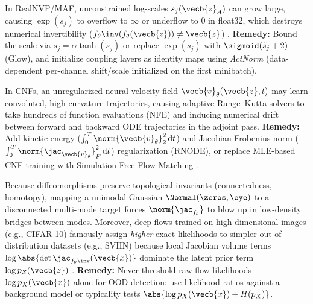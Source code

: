\documentclass[../../../../master.tex]{subfiles}
\begin{document}
\begin{pitfall}
In RealNVP/MAF, unconstrained log-scales $s_j(\vecb{z}_A)$ can grow large, causing $\exp(s_j)$ to overflow to $\infty$ or underflow to $0$ in float32, which destroys numerical invertibility ($f_\theta\inv(f_\theta(\vecb{z})) \ne \vecb{z}$) . \textbf{Remedy:} Bound the scale via $s_j = \alpha \tanh(\tilde{s}_j)$ or replace $\exp(s_j)$ with $\sigmoid(\tilde{s}_j + 2)$ (Glow), and initialize coupling layers as identity maps using \emph{ActNorm} (data-dependent per-channel shift/scale initialized on the first minibatch).
\end{pitfall}

\begin{pitfall}
In CNFs, an unregularized neural velocity field $\vecb{v}_\theta(\vecb{z}, t)$ may learn convoluted, high-curvature trajectories, causing adaptive Runge--Kutta solvers to take hundreds of function evaluations (NFE) and inducing numerical drift between forward and backward ODE trajectories in the adjoint pass. \textbf{Remedy:} Add kinetic energy ($\int_0^T \norm{\vecb{v}_\theta}_2^2\,\mathrm{d}t$) and Jacobian Frobenius norm ($\int_0^T \norm{\jac_{\vecb{v}_\theta}}_F^2\,\mathrm{d}t$) regularization (RNODE), or replace MLE-based CNF training with Simulation-Free Flow Matching .
\end{pitfall}

\begin{pitfall}
Because diffeomorphisms preserve topological invariants (connectedness, homotopy), mapping a unimodal Gaussian $\Normal(\zeros, \eye)$ to a disconnected multi-mode target forces $\norm{\jac_{f_\theta}}$ to blow up in low-density bridges between modes. Moreover, deep flows trained on high-dimensional images (e.g., CIFAR-10) famously assign \emph{higher} exact likelihoods to simpler out-of-distribution datasets (e.g., SVHN) because local Jacobian volume terms $\log\abs{\det\jac_{f_\theta\inv}(\vecb{x})}$ dominate the latent prior term $\log p_Z(\vecb{z})$ . \textbf{Remedy:} Never threshold raw flow likelihoods $\log p_X(\vecb{x})$ alone for OOD detection; use likelihood ratios against a background model or typicality tests $\abs{\log p_X(\vecb{x}) + H(p_X)}$.
\end{pitfall}
\end{document}
